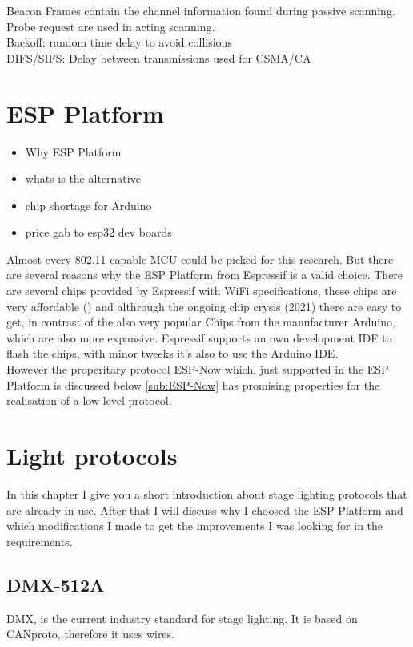 \documentclass[]{ccs-thesis}
\begin{document}
Beacon Frames
contain the channel information found during passive scanning. Probe request are used in acting scanning.\\

Backoff: 
random time delay to avoid collisions\\

DIFS/SIFS:
Delay between transmissions used for \ac{CSMA/CA}

\section{ESP Platform}
\begin{itemize}
	\item Why ESP Platform 
	\item whats is the alternative
	\item chip shortage for Arduino
	\item price gab to esp32 dev boards
\end{itemize}
Almost every 802.11 capable \ac{MCU} could be picked for this research.
But there are several reasons why the ESP Platform from Espressif is a valid choice.
There are several chips provided by Espressif with WiFi specifications, these chips are very affordable () 
and althrough the ongoing chip crysis (2021) there are easy to get, in contrast of the also very popular Chips from the manufacturer Arduino, which are also more expansive.
Espressif supports an own development IDF to flash the chips, with minor tweeks it's also to use the Arduino IDE.\\
However the properitary protocol ESP-Now which, just supported in the ESP Platform is discussed below \cref{sub:ESP-Now} has promising properties for the realisation of a low level protocol.

\section{Light protocols}

In this chapter I give you a short introduction about stage lighting protocols that are already in use. 
After that I will discuss why I choosed the ESP Platform and which modifications I made to get the improvements I was looking for in the requirements.

\subsection*{DMX-512A}
\ac{DMX}, is the current industry standard for stage lighting. It is based on \ac{CANproto}, therefore it uses wires.
\end{document}
